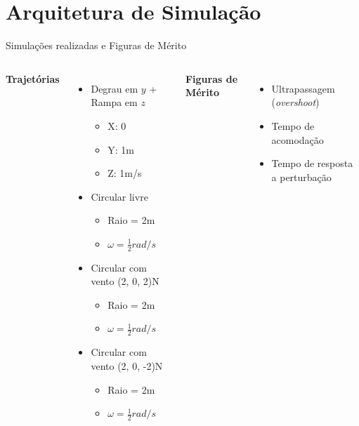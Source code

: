 \documentclass[aspectratio=169, 11pt]{beamer}
\begin{document}
\section{Arquitetura de Simulação}


\begin{frame}{Simulações realizadas e Figuras de Mérito}
  \begin{columns}[t]
      \textbf{Trajetórias}
      \begin{itemize}
        \item  Degrau em $y$ + Rampa em $z$
        \begin{itemize}
            \item X: 0
            \item Y: 1m
            \item Z: 1m/s
        \end{itemize}
        \item Circular livre
            \begin{itemize}
            \item Raio = 2m
            \item $\omega = \frac{1}{2} rad/s$
            \end{itemize}
        \item Circular com vento (2, 0, 2)N
            \begin{itemize}
            \item Raio = 2m
            \item $\omega = \frac{1}{2} rad/s$
            \end{itemize}
        \item Circular com vento (2, 0, -2)N
            \begin{itemize}
            \item Raio = 2m
            \item $\omega = \frac{1}{2} rad/s$
            \end{itemize}

      \end{itemize}
      \textbf{Figuras de Mérito}
      \begin{itemize}
        \item Ultrapassagem (\textit{overshoot})
        \item Tempo de acomodação
        \item Tempo de resposta a perturbação
      \end{itemize}
  \end{columns}
\end{frame}
\end{document}
